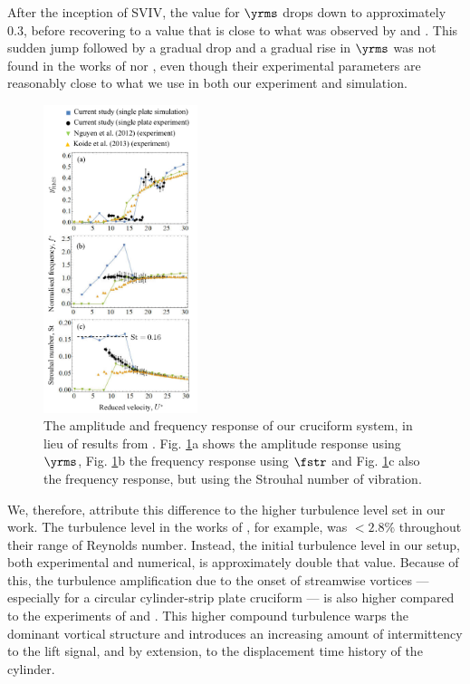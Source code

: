 \documentclass[a4paper,fleqn]{cas-sc}
\begin{document}
After the inception of SVIV, the value for  $\yrms$ drops down to approximately 0.3, before recovering to a value that is close to what was observed by \citet{Nguyen2012} and \citet{Koide2013}. This sudden jump followed by a gradual drop and a gradual rise in  $\yrms$ was not found in the works of \citet{Nguyen2012} nor \citet{Koide2013}, even though their experimental parameters are reasonably close to what we use in both our experiment and simulation.


\begin{figure}
  \centering
  \includegraphics[width=0.4\textwidth]{figs/figure10}
  \caption{The amplitude and frequency response of our cruciform system, in lieu of results from \citet{Nguyen2012,Koide2013}. Fig. \ref{fig:ampFreqComp}a shows the amplitude response using $\yrms$, Fig. \ref{fig:ampFreqComp}b the frequency response using $\fstr$ and Fig. \ref{fig:ampFreqComp}c also the frequency response, but using the Strouhal number of vibration.} \label{fig:ampFreqComp}
\end{figure}

We, therefore, attribute this difference to the higher turbulence level set in our work. The turbulence level in the works of \citet{Nguyen2012}, for example, was  $<2.8\%$ throughout their range of Reynolds number. Instead, the initial turbulence level in our setup, both experimental and numerical, is approximately double that value. Because of this, the turbulence amplification due to the onset of streamwise vortices  \citep{Zhao2018a} --- especially for a circular cylinder-strip plate cruciform \citep{Koide2017} --- is also higher compared to the experiments of \citet{Nguyen2012} and \citet{Koide2013}. This higher compound turbulence warps the dominant vortical structure and introduces an increasing amount of intermittency to the lift signal, and by extension, to the displacement time history of the cylinder.
\end{document}
